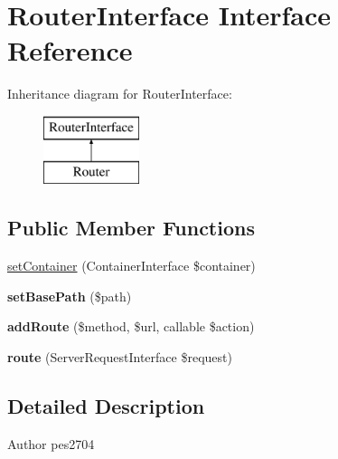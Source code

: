 \hypertarget{interface_pes_1_1_router_1_1_router_interface}{}\section{Router\+Interface Interface Reference}
\label{interface_pes_1_1_router_1_1_router_interface}
Inheritance diagram for Router\+Interface\+:\begin{figure}[H]
\begin{center}
\leavevmode
\includegraphics[height=2.000000cm]{interface_pes_1_1_router_1_1_router_interface}
\end{center}
\end{figure}
\subsection*{Public Member Functions}
\begin{DoxyCompactItemize}
\item 
\mbox{\hyperlink{interface_pes_1_1_router_1_1_router_interface_abdef16a38dcfab7dc5e5f4e9c50269a3}{set\+Container}} (Container\+Interface \$container)
\item 
\mbox{\label{interface_pes_1_1_router_1_1_router_interface_a317e16be08edc5bc1297d0884d3ed5b1}} 
{\bfseries set\+Base\+Path} (\$path)
\item 
\mbox{\label{interface_pes_1_1_router_1_1_router_interface_a482ee42e66628000514ac7764b735eb7}} 
{\bfseries add\+Route} (\$method, \$url, callable \$action)
\item 
\mbox{\label{interface_pes_1_1_router_1_1_router_interface_aa6b44d5906fa3d97b3c9bd94a92df045}} 
{\bfseries route} (Server\+Request\+Interface \$request)
\end{DoxyCompactItemize}


\subsection{Detailed Description}
\begin{DoxyAuthor}{Author}
pes2704 
\end{DoxyAuthor}


